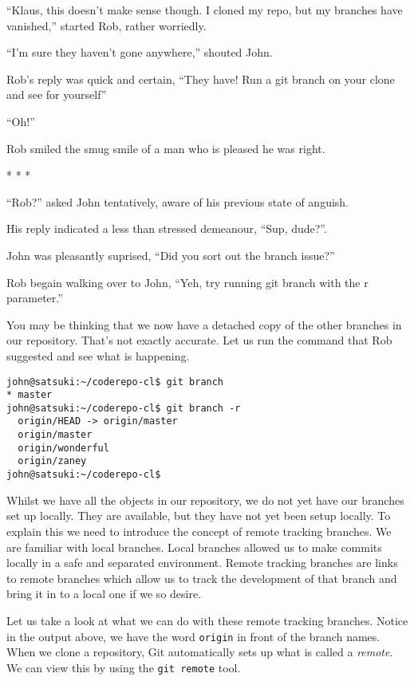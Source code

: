 \begin{trenches}
``Klaus, this doesn't make sense though.  I cloned my repo, but my branches have vanished,'' started Rob, rather worriedly.

``I'm sure they haven't gone anywhere,'' shouted John.  

Rob's reply was quick and certain, ``They have!  Run a git branch on your clone and see for yourself''

``Oh!''

Rob smiled the smug smile of a man who is pleased he was right.

\begin{center} * * * \end{center}

``Rob?'' asked John tentatively, aware of his previous state of anguish.

His reply indicated a less than stressed demeanour, ``Sup, dude?''.

John was pleasantly suprised, ``Did you sort out the branch issue?''

Rob begain walking over to John, ``Yeh, try running git branch with the r parameter.''

\end{trenches}

You may be thinking that we now have a detached copy of the other branches in our repository.  That's not exactly accurate.  Let us run the command that Rob suggested and see what is happening.  

\begin{Verbatim}[frame=leftline,framerule=1mm,fontsize=\relsize{-3}] 
john@satsuki:~/coderepo-cl$ git branch
* master
john@satsuki:~/coderepo-cl$ git branch -r
  origin/HEAD -> origin/master
  origin/master
  origin/wonderful
  origin/zaney
john@satsuki:~/coderepo-cl$ 
\end{Verbatim}

Whilst we have all the objects in our repository, we do not yet have our branches set up locally.  They are available, but they have not yet been setup locally.  To explain this we need to introduce the concept of remote tracking branches.  We are familiar with local branches.  Local branches allowed us to make commits locally in a safe and separated environment.  Remote tracking branches are links to remote branches which allow us to track the development of that branch and bring it in to a local one if we so desire.

Let us take a look at what we can do with these remote tracking branches.  Notice in the output above, we have the word \texttt{origin} in front of the branch names.  When we clone a repository, Git automatically sets up what is called a \emph{remote}.  We can view this by using the \texttt{git remote} tool.

